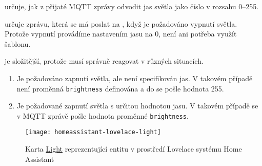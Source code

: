  určuje, jak z přijaté MQTT zprávy odvodit jas
světla jako číslo v rozsahu \numrange{0}{255}.

 určuje zprávu, která se má poslat na
, když je požadováno vypnutí světla. Protože vypnutí
provádíme nastavením jasu na \num{0}, není ani potřeba využít šablonu.

 je složitější, protože musí správně reagovat
v různých situacích.
\begin{enumerate}
    \item Je požadováno zapnutí světla, ale není specifikován jas. V takovém
        případě není proměnná \texttt{brightness} definována a do
         se pošle hodnota \num{255}.
    \item Je požadované zapnutí světla s určitou hodnotou jasu. V takovém
        případě se v MQTT zprávě pošle hodnota proměnné \texttt{brightness}.
\end{enumerate}

\begin{figure}[htb]
    \centering
    \texttt{[image: homeassistant-lovelace-light]}
    \caption{%
        Karta \href{https://www.home-assistant.io/lovelace/light/}{Light}
        reprezentující entitu  v prostředí
        Lovelace systému Home Assistant
    }
    \label{fig:homeassistant lovelace light}
\end{figure}




